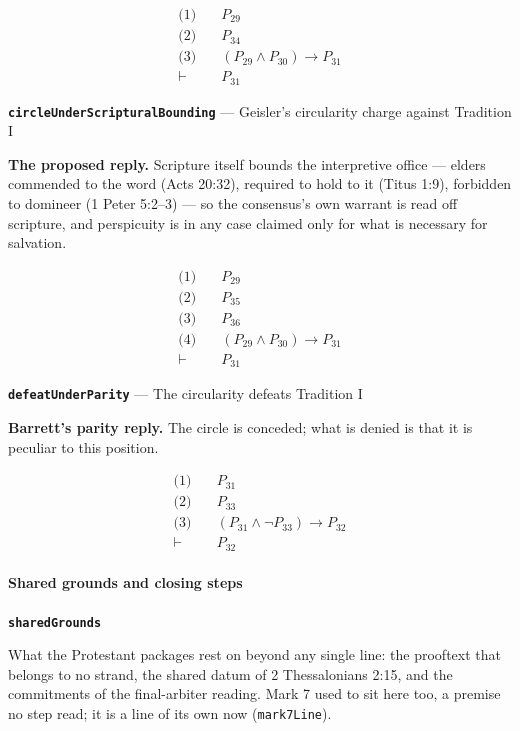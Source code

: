 \documentclass[11pt]{article}
\begin{document}
\begin{align*}
  \text{(1)} \quad & P_{29} \\
  \text{(2)} \quad & P_{34} \\
  \text{(3)} \quad & (P_{29} \land P_{30}) \rightarrow P_{31} \\
  \vdash \quad & P_{31}
\end{align*}
\par\medskip\noindent\textbf{\texttt{circle\allowbreak{}Under\allowbreak{}Scriptural\allowbreak{}Bounding}} --- Geisler's circularity charge against Tradition I\par\nobreak\noindent
\textbf{The proposed reply.} Scripture itself bounds the interpretive office — elders commended to the word (Acts 20:32), required to hold to it (Titus 1:9), forbidden to domineer (1 Peter 5:2–3) — so the consensus's own warrant is read off scripture, and perspicuity is in any case claimed only for what is necessary for salvation.

\begin{align*}
  \text{(1)} \quad & P_{29} \\
  \text{(2)} \quad & P_{35} \\
  \text{(3)} \quad & P_{36} \\
  \text{(4)} \quad & (P_{29} \land P_{30}) \rightarrow P_{31} \\
  \vdash \quad & P_{31}
\end{align*}
\par\medskip\noindent\textbf{\texttt{defeat\allowbreak{}Under\allowbreak{}Parity}} --- The circularity defeats Tradition I\par\nobreak\noindent
\textbf{Barrett's parity reply.} The circle is conceded; what is denied is that it is peculiar to this position.

\begin{align*}
  \text{(1)} \quad & P_{31} \\
  \text{(2)} \quad & P_{33} \\
  \text{(3)} \quad & (P_{31} \land \lnot P_{33}) \rightarrow P_{32} \\
  \vdash \quad & P_{32}
\end{align*}
\paragraph*{Shared grounds and closing steps}
\leavevmode\par
\par\medskip\noindent\textbf{\texttt{shared\allowbreak{}Grounds}}\par\nobreak\noindent
What the Protestant packages rest on beyond any single line: the prooftext that belongs to no strand, the shared datum of 2 Thessalonians 2:15, and the commitments of the final-arbiter reading. Mark 7 used to sit here too, a premise no step read; it is a line of its own now (\texttt{mark7\allowbreak{}Line}).
\end{document}
